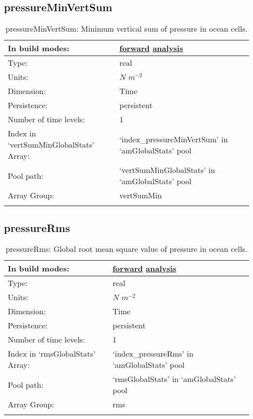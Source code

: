 \subsection[pressureMinVertSum]{pressureMinVertSum}
\label{subsec:var_sec_amGlobalStats_pressureMinVertSum}
\begin{center}
\begin{longtable}{| p{2.0in} | p{4.0in} |}
        \hline 
        In build modes: & \hyperref[subsec:forward_var_tab_amGlobalStats]{forward} \hyperref[subsec:analysis_var_tab_amGlobalStats]{analysis} \\
        \hline 
        Type: & real \\
        \hline 
        Units: & $N$ $m^{-2}$ \\
        \hline 
        Dimension: & Time \\
        \hline 
        Persistence: & persistent \\
        \hline 
        Number of time levels: & 1 \\
        \hline 
		 Index in `vertSumMinGlobalStats' Array: & `index\_pressureMinVertSum' in `amGlobalStats' pool \\
		 \hline 
            Pool path: & `vertSumMinGlobalStats' in `amGlobalStats' pool \\
		 \hline 
		 Array Group: & vertSumMin \\
		 \hline 
    \caption{pressureMinVertSum: Minimum vertical sum of pressure in ocean cells.}
\end{longtable}
\end{center}
\subsection[pressureRms]{pressureRms}
\label{subsec:var_sec_amGlobalStats_pressureRms}
\begin{center}
\begin{longtable}{| p{2.0in} | p{4.0in} |}
        \hline 
        In build modes: & \hyperref[subsec:forward_var_tab_amGlobalStats]{forward} \hyperref[subsec:analysis_var_tab_amGlobalStats]{analysis} \\
        \hline 
        Type: & real \\
        \hline 
        Units: & $N$ $m^{-2}$ \\
        \hline 
        Dimension: & Time \\
        \hline 
        Persistence: & persistent \\
        \hline 
        Number of time levels: & 1 \\
        \hline 
		 Index in `rmsGlobalStats' Array: & `index\_pressureRms' in `amGlobalStats' pool \\
		 \hline 
            Pool path: & `rmsGlobalStats' in `amGlobalStats' pool \\
		 \hline 
		 Array Group: & rms \\
		 \hline 
    \caption{pressureRms: Global root mean square value of pressure in ocean cells.}
\end{longtable}
\end{center}

